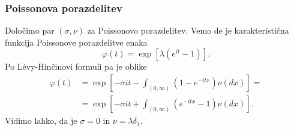 \documentclass[]{beamer} %
\theoremstyle{plain}
\begin{document}
\begin{frame}
  \frametitle{Poissonova porazdelitev}
  Določimo par $(\sigma, \nu)$ za Poissonovo porazdelitev.
  \pause
  Vemo de je karakteristična funkcija Poissonove porazdelitve enaka
  $$
  \varphi(t) = \exp\left[\lambda(e^{it} - 1)\right].
  $$
  \pause
  Po Lévy-Hinčinovi formuli pa je oblike 
  \begin{align*}
  \varphi(t) &= \exp\left[-\sigma it - \int_{(0, \infty)}(1 - e^{-itx})\nu(dx)\right]= \\
             &= \exp\left[-\sigma it + \int_{(0, \infty)}(e^{-itx} - 1)\nu(dx)\right].
  \end{align*}
  \pause
  Vidimo lahko, da je $\sigma = 0$ in $\nu = \lambda \delta_1$.
\end{frame}
\end{document}

